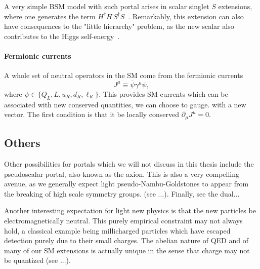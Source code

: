 A very simple BSM model with such portal arises in scalar singlet $S$ extensions, where one generates the term $H^\dagger H \, S^\dagger S$~\cite{Silveira:1985rk}. Remarkably, this extension can also have consequences to the "little hierarchy" problem, as the new scalar also contributes to the Higgs self-energy~\cite{Craig:2013xia}.


\paragraph{Fermionic currents}

A whole set of neutral operators in the SM come from the fermionic currents
\begin{equation}
 J^\mu \equiv \overline{\psi} \gamma^\mu \psi,
\end{equation}
where $\psi \in \{Q_L, L, u_R, d_R, \ell_R\}$. This provides SM currents which can be associated with new conserved quantities, \eg we can choose to gauge. with a new vector. The first condition is that it be locally conserved $\partial_\mu J^\mu = 0$. 


\subsection{Others}

Other possibilities for portals which we will not discuss in this thesis include the pseudoscalar portal, also known as the axion. This is also a very compelling avenue, as we generally expect light pseudo-Nambu-Goldstones to appear from the breaking of high scale symmetry groups. (see ...). Finally, see the dual...

Another interesting expectation for light new physics is that the new particles be electromagnetically neutral. This purely empirical constraint may not always hold, a classical example being millicharged particles which have escaped detection purely due to their small charges. The abelian nature of QED and of many of our SM extensions is actually unique in the sense that charge may not be quantized (see \eg ...).